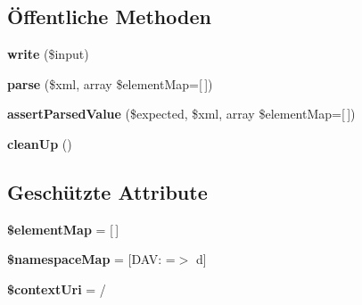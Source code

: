 \subsection*{Öffentliche Methoden}
\begin{DoxyCompactItemize}
\item 
\mbox{\label{class_sabre_1_1_d_a_v_1_1_xml_1_1_xml_test_a0be3b91911234eefb33e795b5edeae38}} 
{\bfseries write} (\$input)
\item 
\mbox{\label{class_sabre_1_1_d_a_v_1_1_xml_1_1_xml_test_a0336cc3d6ce855a2b70f51d5c027cb53}} 
{\bfseries parse} (\$xml, array \$element\+Map=\mbox{[}$\,$\mbox{]})
\item 
\mbox{\label{class_sabre_1_1_d_a_v_1_1_xml_1_1_xml_test_a8edbfdca7e232f434757f6b5723ac499}} 
{\bfseries assert\+Parsed\+Value} (\$expected, \$xml, array \$element\+Map=\mbox{[}$\,$\mbox{]})
\item 
\mbox{\label{class_sabre_1_1_d_a_v_1_1_xml_1_1_xml_test_afb065e5f51c21343ffa7a767caea131e}} 
{\bfseries clean\+Up} ()
\end{DoxyCompactItemize}
\subsection*{Geschützte Attribute}
\begin{DoxyCompactItemize}
\item 
\mbox{\label{class_sabre_1_1_d_a_v_1_1_xml_1_1_xml_test_ac9cad9e6a0e58652a500165094fcb103}} 
{\bfseries \$element\+Map} = \mbox{[}$\,$\mbox{]}
\item 
\mbox{\label{class_sabre_1_1_d_a_v_1_1_xml_1_1_xml_test_a84b8fa64bc1856436f52ae6c2ce7c844}} 
{\bfseries \$namespace\+Map} = \mbox{[}\textquotesingle{}D\+A\+V\+:\textquotesingle{} =$>$ \textquotesingle{}d\textquotesingle{}\mbox{]}
\item 
\mbox{\label{class_sabre_1_1_d_a_v_1_1_xml_1_1_xml_test_a63c29531d6eefc4ca69c09f5d73798db}} 
{\bfseries \$context\+Uri} = \textquotesingle{}/\textquotesingle{}
\end{DoxyCompactItemize}


